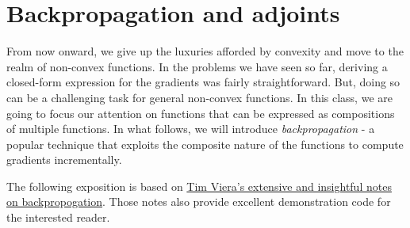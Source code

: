 \section{Backpropagation and adjoints}
 From now onward, we give up the luxuries afforded by convexity and move to the realm of non-convex functions. In the problems we have seen so far, deriving a closed-form expression for the gradients was fairly straightforward. But, doing so can be a challenging task for general non-convex functions. In this class, we are going to focus our attention on functions that can be expressed as compositions of multiple functions. In what follows, we will introduce \textit{backpropagation} - a popular technique that exploits the composite nature of the functions to compute gradients incrementally. 

 The following exposition is based on  \href{https://timvieira.github.io/blog/post/2017/08/18/backprop-is-not-just-the-chain-rule/}{Tim Viera's extensive and insightful notes on backpropogation}. Those notes also provide excellent demonstration code for the interested reader. 

